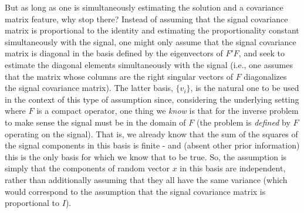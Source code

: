 \documentclass{amsart}
\numberwithin{equation}{section}
\theoremstyle{definition}
\numberwithin{theorem}{section}
\begin{document}
But as long as one is simultaneously estimating the solution and a covariance matrix feature, why stop there?   Instead of assuming that the   signal covariance matrix is proportional to the identity and estimating the proportionality constant simultaneously with the signal, one might only assume that the signal covariance matrix is diagonal in the basis defined by the eigenvectors of $F'F$, and seek to estimate the diagonal elements simultaneously with the signal (i.e., one assumes  that the matrix whose columns are the right singular vectors of  $F$ diagonalizes the signal covariance matrix).
The latter basis, $\{v_i\}$, is the natural one to be used in the context of this type of assumption since, considering the underlying setting where $F$ is a compact operator, one thing we {\it know} is that for the inverse problem to make sense the signal must be in the domain of $F$ (the problem is {\it defined} by $F$ operating on the signal). That is, we already know that the sum of the squares of the signal components in this basis is finite - and (absent other prior information) this is the only basis for which we know that to be true.  So, the assumption is simply that the components of random vector $x$ in this basis are independent, rather than additionally assuming that they all have the same variance (which would correspond to the assumption that the signal covariance matrix is proportional to $I$).
\end{document}

